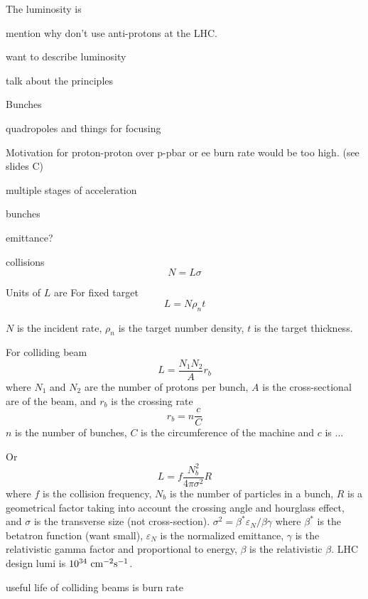 The luminosity is

mention why don't use anti-protons at the LHC.

want to describe luminosity

talk about the principles

Bunches 


quadropoles and things for focusing


Motivation for proton-proton over p-pbar or ee
burn rate would be too high. (see slides C)



multiple stages of acceleration



bunches

emittance?

collisions
\begin{equation}
N= L\sigma
\end{equation}

Units of $L$ are \lumiunits
For fixed target
\begin{equation}
L = N \rho_n t
\end{equation}

$N$ is the incident rate, $\rho_n$ is the target number
density, $t$ is the target thickness.

For colliding beam
\begin{equation}
L = \frac{N_1 N_2}{A} r_b
\end{equation}
where $N_1$ and $N_2$ are the number of protons per bunch, 
$A$ is the cross-sectional are of the beam, 
and $r_b$ is the crossing rate
\begin{equation}
r_b = n \frac{c}{C}
\end{equation}
$n$ is the number of bunches, $C$ is the circumference of the machine
and $c$ is ...

Or 
\begin{equation}
L=f \frac{N_b^2}{4\pi\sigma^2} R
\end{equation}
where $f$ is the collision frequency, $N_b$ is the number
of particles in a bunch, $R$ is a geometrical factor
taking into account the crossing angle and hourglass effect, 
and $\sigma$ is the transverse size (not cross-section).
$\sigma^2 = \beta^* \varepsilon_N/ \beta\gamma$
where $\beta^*$ is the betatron function (want small), 
$\varepsilon_N$ is the normalized emittance, $\gamma$ is the 
relativistic gamma factor and proportional to energy, $\beta$ is the 
relativistic $\beta$.
LHC design lumi is $10^{34}~\textrm{cm}^{-2}\textrm{s}^{-1}$.

useful life of colliding beams is burn rate

